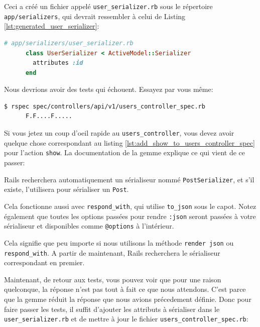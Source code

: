 \documentclass[]{report}
\begin{document}
    Ceci a créé un fichier appelé \verb|user_serializer.rb| sous le répertoire \verb|app/serializers|, qui devrait ressembler à celui de Listing \ref{lst:generated_user_serializer}:

    \begin{scriptsize}
      \begin{lstlisting}[language=ruby, caption={Sérialsateur d'utilisateurs généré}, label={lst:generated_user_serializer}]
      # app/serializers/user_serializer.rb
      class UserSerializer < ActiveModel::Serializer
        attributes :id
      end
      \end{lstlisting}
    \end{scriptsize}

    Nous devrions avoir des tests qui échouent. Essayez par vous même:

    \begin{scriptsize}
      \begin{lstlisting}[language=bash]
      $ rspec spec/controllers/api/v1/users_controller_spec.rb
      F.F....F.....
      \end{lstlisting}
    \end{scriptsize}

    Si vous jetez un coup d'oeil rapide au \verb|users_controller|, vous devez avoir quelque chose correspondant au listing \ref{lst:add_show_to_users_controller_spec} pour l'action \verb|show|. La documentation de la gemme explique ce qui vient de ce passer:

    \begin{displayquote}
      Rails recherchera automatiquement un sérialiseur nommé \verb|PostSerializer|, et s'il existe, l'utilisera pour sérialiser un \verb|Post|.

      Cela fonctionne aussi avec \verb|respond_with|, qui utilise \verb|to_json| sous le capot. Notez également que toutes les options passées pour rendre \verb|:json| seront passées à votre sérialiseur et disponibles comme \verb|@options| à l'intérieur.

      Cela signifie que peu importe si nous utilisons la méthode \verb|render json| ou \verb|respond_with|. A partir de maintenant, Rails recherchera le sérialiseur correspondant en premier.
    \end{displayquote}

    Maintenant, de retour aux tests, vous pouvez voir que pour une raison quelconque, la réponse n'est pas tout à fait ce que nous attendons. C'est parce que la gemme réduit la réponse que nous avions précedement définie. Donc pour faire passer les tests, il suffit d'ajouter les attributs à sérialiser dans le \verb|user_serializer.rb| et de mettre à jour le fichier \verb|users_controller_spec.rb|:
\end{document}
